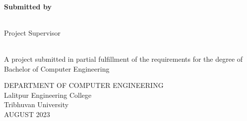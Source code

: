 \begin{center}
    \linespread{1.6}
    \thispagestyle{empty}
    \textbf{\large{\thetitle}} \\
    \vspace{2cm}

    \textbf{Submitted by} \\
    {\theauthor} \\

    \vspace{2cm}

    Project Supervisor\\
    {\thesupervisor} \\

    \vspace{2.2cm}

    A project submitted in partial fulfillment of the requirements for the degree of\\
    Bachelor of Computer Engineering

    \vspace{3cm}

    DEPARTMENT OF COMPUTER ENGINEERING \\
    Lalitpur Engineering College\\
    Tribhuvan University\\
    \vspace{2.4 in}
    AUGUST 2023

\end{center}
